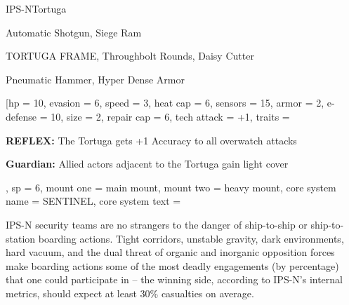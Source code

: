 

\begin{mech}{IPS-N}{Tortuga}


\begin{license}
\item Automatic Shotgun, Siege Ram
\item TORTUGA FRAME, Throughbolt Rounds, Daisy Cutter
\item Pneumatic Hammer, Hyper Dense Armor
\end{license}

\frameBox
[hp = 10,
evasion = 6,
speed = 3,
heat cap = 6,
sensors = 15,
armor = 2,
e-defense = 10,
size = 2,
repair cap = 6,
tech attack = +1,
traits = {\textbf{REFLEX:} The Tortuga gets +1 Accuracy to all overwatch attacks

\textbf{Guardian:} Allied actors adjacent to the Tortuga gain light cover },
sp = 6,
mount one = main mount,
mount two = heavy mount,
core system name = SENTINEL,
core system text = {IPS-N security teams are no strangers to the danger of ship-to-ship or ship-to-station boarding actions. Tight corridors, unstable gravity, dark environments, hard vacuum, and the dual threat of organic and inorganic opposition forces make boarding actions some of the most deadly engagements (by percentage) that one could participate in -- the winning side, according to IPS-N’s internal metrics, should expect at least 30\% casualties on average.

}
\end{mech}
